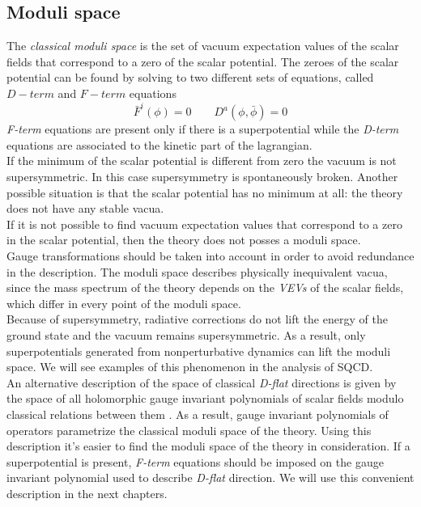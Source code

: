 \subsection{Moduli space}
\label{sec:subsection_moduli_space}
The \emph{classical moduli space} is the set of vacuum expectation values of the scalar fields that correspond to a zero of the scalar potential.
The zeroes of the scalar potential can be found by solving to two different sets of equations, called $D-term$ and $F-term $ equations
\begin{equation}
\bar{F}^i ( \phi) = 0 \qquad D^a (\phi , \bar{\phi}) = 0
\end{equation}
\emph{F-term} equations are present only if there is a superpotential while the \emph{D-term} equations are associated to the kinetic part of the lagrangian.\\
If the minimum of the scalar potential is different from zero the vacuum is not supersymmetric. 
In this case supersymmetry is spontaneously broken.
Another possible situation is that the scalar potential has no minimum at all: the theory does not have any stable vacua.\\
If it is not possible to find vacuum expectation values that correspond to a zero in the scalar potential, then the theory does not posses a moduli space.\\
Gauge transformations should be taken into account in order to avoid redundance in the description.
The moduli space describes physically inequivalent vacua, since the mass spectrum of the theory depends on the \emph{VEVs} of the scalar fields, which differ in every point of the moduli space. \\
Because of supersymmetry, radiative corrections do not lift the energy of the ground state and the vacuum remains supersymmetric.
As a result, only superpotentials generated from nonperturbative dynamics can lift the moduli space. 
We will see examples of this phenomenon in the analysis of SQCD.
\\
An alternative description of the space of classical \emph{D-flat} directions is given by the space of all holomorphic gauge invariant polynomials of scalar fields modulo classical relations between them \cite{Luty:1995sd}.
As a result, gauge invariant polynomials of operators parametrize the classical moduli space of the theory. 
Using this description it's easier to find the moduli space of the theory in consideration.
If a superpotential is present, \emph{F-term} equations should be imposed on the gauge invariant polynomial used to describe \emph{D-flat} direction.
We will use this convenient description in the next chapters.










